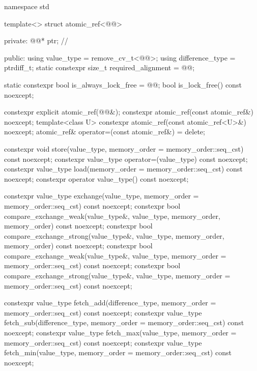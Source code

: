 \begin{codeblock}
namespace std {
  template<> struct atomic_ref<@@> {
  private:
    @@* ptr;        // \expos

  public:
    using value_type = remove_cv_t<@@>;
    using difference_type = ptrdiff_t;
    static constexpr size_t required_alignment = @@;

    static constexpr bool is_always_lock_free = @@;
    bool is_lock_free() const noexcept;

    constexpr explicit atomic_ref(@@&);
    constexpr atomic_ref(const atomic_ref&) noexcept;
    template<class U>
      constexpr atomic_ref(const atomic_ref<U>&) noexcept;
    atomic_ref& operator=(const atomic_ref&) = delete;

    constexpr void store(value_type, memory_order = memory_order::seq_cst) const noexcept;
    constexpr value_type operator=(value_type) const noexcept;
    constexpr value_type load(memory_order = memory_order::seq_cst) const noexcept;
    constexpr operator value_type() const noexcept;

    constexpr value_type exchange(value_type,
                                  memory_order = memory_order::seq_cst) const noexcept;
    constexpr bool compare_exchange_weak(value_type&, value_type,
                                         memory_order, memory_order) const noexcept;
    constexpr bool compare_exchange_strong(value_type&, value_type,
                                           memory_order, memory_order) const noexcept;
    constexpr bool compare_exchange_weak(value_type&, value_type,
                                         memory_order = memory_order::seq_cst) const noexcept;
    constexpr bool compare_exchange_strong(value_type&, value_type,
                                           memory_order = memory_order::seq_cst) const noexcept;

    constexpr value_type fetch_add(difference_type,
                                   memory_order = memory_order::seq_cst) const noexcept;
    constexpr value_type fetch_sub(difference_type,
                                   memory_order = memory_order::seq_cst) const noexcept;
    constexpr value_type fetch_max(value_type,
                                   memory_order = memory_order::seq_cst) const noexcept;
    constexpr value_type fetch_min(value_type,
                                   memory_order = memory_order::seq_cst) const noexcept;

}}
\end{codeblock}
